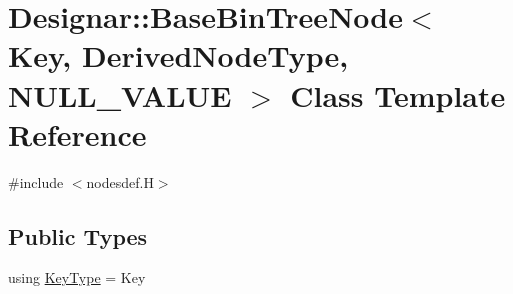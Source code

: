 \hypertarget{class_designar_1_1_base_bin_tree_node}{}\section{Designar\+:\+:Base\+Bin\+Tree\+Node$<$ Key, Derived\+Node\+Type, N\+U\+L\+L\+\_\+\+V\+A\+L\+UE $>$ Class Template Reference}
\label{class_designar_1_1_base_bin_tree_node}


{\ttfamily \#include $<$nodesdef.\+H$>$}

\subsection*{Public Types}
\begin{DoxyCompactItemize}
\item 
using \hyperlink{class_designar_1_1_base_bin_tree_node_adc177cc1f4ed5bb9baf467a2ff6e4e85}{Key\+Type} = Key
\end{DoxyCompactItemize}
